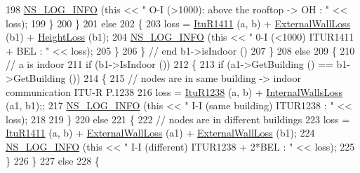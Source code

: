 \begin{DoxyCode}
198                   \hyperlink{group__logging_gafbd73ee2cf9f26b319f49086d8e860fb}{NS\_LOG\_INFO} (\textcolor{keyword}{this} << \textcolor{stringliteral}{" O-I (>1000): above the rooftop -> OH : "} << loss);
199                 \}
200             \}
201           \textcolor{keywordflow}{else}
202             \{
203               loss = \hyperlink{classns3_1_1HybridBuildingsPropagationLossModel_a96de0ed2ba5a5e579e2c20942ca568fa}{ItuR1411} (a, b) + \hyperlink{classns3_1_1BuildingsPropagationLossModel_a67bc86adffb07914535f5f6f435fac47}{ExternalWallLoss} (b1) + 
      \hyperlink{classns3_1_1BuildingsPropagationLossModel_a52e994b78d200ecb8d30d1b61dedbfff}{HeightLoss} (b1);
204               \hyperlink{group__logging_gafbd73ee2cf9f26b319f49086d8e860fb}{NS\_LOG\_INFO} (\textcolor{keyword}{this} << \textcolor{stringliteral}{" 0-I (<1000) ITUR1411 + BEL : "} << loss);
205             \}
206         \} \textcolor{comment}{// end b1->isIndoor ()}
207     \}
208   \textcolor{keywordflow}{else}
209     \{
210       \textcolor{comment}{// a is indoor}
211       \textcolor{keywordflow}{if} (b1->IsIndoor ())
212         \{
213           \textcolor{keywordflow}{if} (a1->GetBuilding () == b1->GetBuilding ())
214             \{
215               \textcolor{comment}{// nodes are in same building -> indoor communication ITU-R P.1238}
216               loss = \hyperlink{classns3_1_1HybridBuildingsPropagationLossModel_aa5d001f95f59c68b78765d1e8536f645}{ItuR1238} (a, b) + \hyperlink{classns3_1_1BuildingsPropagationLossModel_a5d8bdc1afcb1061352e0e24a0b3db396}{InternalWallsLoss} (a1, b1);;
217               \hyperlink{group__logging_gafbd73ee2cf9f26b319f49086d8e860fb}{NS\_LOG\_INFO} (\textcolor{keyword}{this} << \textcolor{stringliteral}{" I-I (same building) ITUR1238 : "} << loss);
218 
219             \}
220           \textcolor{keywordflow}{else}
221             \{
222               \textcolor{comment}{// nodes are in different buildings}
223               loss = \hyperlink{classns3_1_1HybridBuildingsPropagationLossModel_a96de0ed2ba5a5e579e2c20942ca568fa}{ItuR1411} (a, b) + \hyperlink{classns3_1_1BuildingsPropagationLossModel_a67bc86adffb07914535f5f6f435fac47}{ExternalWallLoss} (a1) + 
      \hyperlink{classns3_1_1BuildingsPropagationLossModel_a67bc86adffb07914535f5f6f435fac47}{ExternalWallLoss} (b1);
224               \hyperlink{group__logging_gafbd73ee2cf9f26b319f49086d8e860fb}{NS\_LOG\_INFO} (\textcolor{keyword}{this} << \textcolor{stringliteral}{" I-I (different) ITUR1238 + 2*BEL : "} << loss);
225             \}
226         \}
227       \textcolor{keywordflow}{else}
228         \{

\end{DoxyCode}
